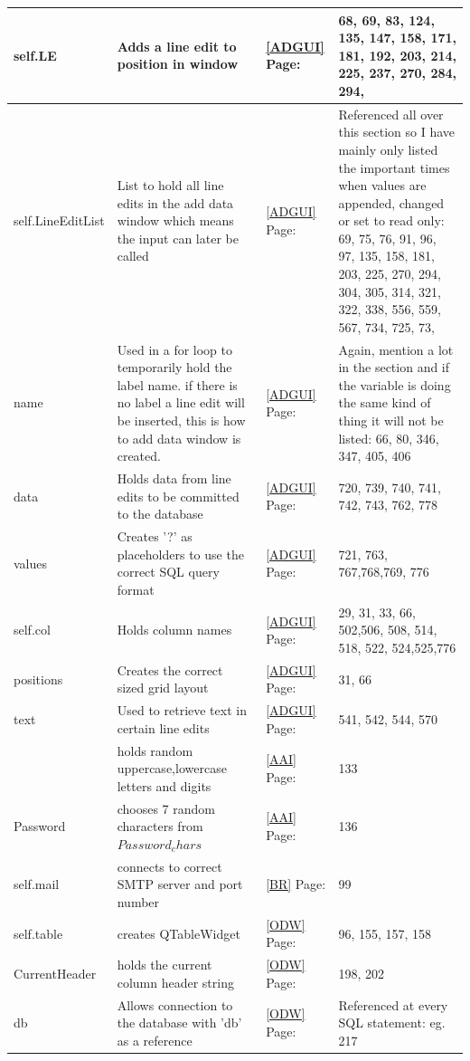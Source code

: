 \begin{center}
\begin{longtable}{|p{4cm}|p{3cm}|p{2cm}|p{3cm}|}
self.LE & Adds a line edit to position in window & \ref{ADGUI} Page: \pageref{ADGUI} &68, 69, 83, 124, 135, 147, 158, 171, 181, 192, 203, 214, 225, 237, 270, 284, 294,     \\ \hline
self.LineEditList & List to hold all line edits in the add data window which means the input can later be called & \ref{ADGUI} Page: \pageref{ADGUI} & Referenced all over this section so I have mainly only listed the important times when values are appended, changed or set to read only: 69, 75, 76, 91, 96, 97, 135, 158, 181, 203, 225, 270, 294, 304, 305, 314, 321, 322, 338, 556, 559, 567, 734, 725, 73,       \\ \hline
name & Used in a for loop to temporarily hold the label name. if there is no label a line edit will be inserted, this is how to add data window is created. & \ref{ADGUI} Page: \pageref{ADGUI} &  Again, mention a lot in the section and if the variable is doing the same kind of thing it will not be listed: 66, 80, 346, 347, 405, 406\\ \hline
data & Holds data from line edits to be committed to the database  & \ref{ADGUI} Page: \pageref{ADGUI} & 720, 739, 740, 741, 742, 743, 762, 778   \\ \hline
values & Creates '?' as placeholders to use the correct SQL query format  & \ref{ADGUI} Page: \pageref{ADGUI} & 721, 763, 767,768,769, 776  \\ \hline
self.col & Holds column names & \ref{ADGUI} Page: \pageref{ADGUI}&29, 31, 33, 66, 502,506, 508, 514, 518, 522, 524,525,776    \\ \hline
positions & Creates the correct sized grid layout & \ref{ADGUI} Page: \pageref{ADGUI} &31, 66   \\ \hline
text & Used to retrieve text in certain line edits  & \ref{ADGUI} Page: \pageref{ADGUI} & 541, 542, 544, 570 \\ \hline

\verb Password_chars & holds random uppercase,lowercase letters and digits & \ref{AAI} Page: \pageref{AAI} & 133 \\ \hline
Password & chooses 7 random characters from  $Password_chars$& \ref{AAI} Page: \pageref{AAI} & 136 \\ \hline

self.mail & connects to correct SMTP server and port number& \ref{BR} Page: \pageref{BR} & 99  \\ \hline


self.table & creates QTableWidget& \ref{ODW}  Page: \pageref{ODW} & 96, 155, 157, 158 \\ \hline
CurrentHeader & holds the current column header string& \ref{ODW} Page: \pageref{ODW} & 198, 202 \\ \hline
db & Allows connection to the database with 'db' as a reference& \ref{ODW} Page: \pageref{ODW}& Referenced at every SQL statement: eg. 217\\ \hline


\end{longtable}
\end{center}
